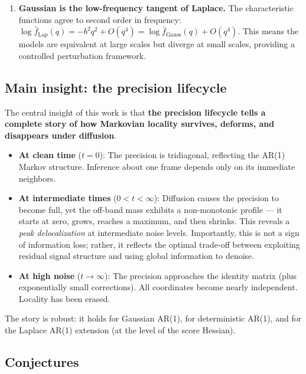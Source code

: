 \documentclass[11pt,a4paper]{article}
\theoremstyle{plain}
\theoremstyle{definition}
\begin{document}
\begin{enumerate}
\item \textbf{Gaussian is the low-frequency tangent of Laplace.}
The characteristic functions agree to second order in frequency: $\log\hat{f}_{\text{Lap}}(q) = -b^2q^2 + O(q^4) = \log\hat{f}_{\text{Gauss}}(q) + O(q^4)$. This means the models are equivalent at large scales but diverge at small scales, providing a controlled perturbation framework.

\end{enumerate}

\subsection{Main insight: the precision lifecycle}
\label{sec:main-insight}

The central insight of this work is that \textbf{the precision lifecycle tells a complete story of how Markovian locality survives, deforms, and disappears under diffusion}.

\begin{itemize}

\item \textbf{At clean time} ($t=0$): The precision is tridiagonal, reflecting the AR(1) Markov structure. Inference about one frame depends only on its immediate neighbors.

\item \textbf{At intermediate times} ($0 < t < \infty$): Diffusion causes the precision to become full, yet the off-band mass exhibits a non-monotonic profile — it starts at zero, grows, reaches a maximum, and then shrinks. This reveals a \emph{peak delocalization} at intermediate noise levels. Importantly, this is not a sign of information loss; rather, it reflects the optimal trade-off between exploiting residual signal structure and using global information to denoise.

\item \textbf{At high noise} ($t \to \infty$): The precision approaches the identity matrix (plus exponentially small corrections). All coordinates become nearly independent. Locality has been erased.

\end{itemize}

The story is robust: it holds for Gaussian AR(1), for deterministic AR(1), and for the Laplace AR(1) extension (at the level of the score Hessian).

\subsection{Conjectures}
\label{sec:conjectures}
\end{document}
